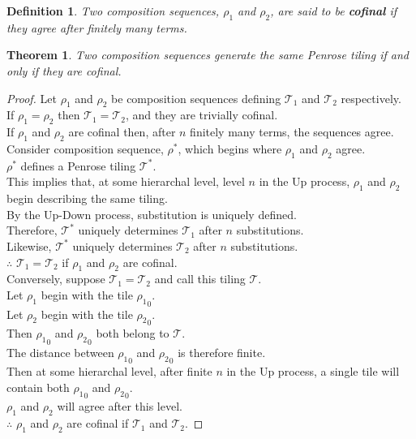 \documentclass[
  oneside,
  11pt, a4paper,
  footinclude=true,
  headinclude=true,
  cleardoublepage=empty
]{scrbook}
\newtheorem{mydef}{Definition}
\newtheorem{mythm}{Theorem}
\begin{document}
\begin{mydef}
Two composition sequences, $\rho_1$ and $\rho_2$, are said to be \textbf{cofinal} if they agree after finitely many terms.
\end{mydef}

\begin{mythm}
Two composition sequences generate the same Penrose tiling if and only if they are cofinal.
\end{mythm}

\begin{proof}
Let $\rho_1$ and $\rho_2$ be composition sequences defining $\mathcal{T}_1$ and $\mathcal{T}_2$ respectively. \\[10pt]
If $\rho_1 = \rho_2$ then $\mathcal{T}_1 = \mathcal{T}_2$, and they are trivially cofinal.\\[10pt]
If $\rho_1$ and $\rho_2$ are cofinal then, after $n$ finitely many terms, the sequences agree.\\
Consider composition sequence, $\rho^*$, which begins where $\rho_1$ and $\rho_2$ agree.\\
$\rho^*$ defines a Penrose tiling  $\mathcal{T}^*$.\\
This implies that, at some hierarchal level, level $n$ in the Up process, $\rho_1$ and $\rho_2$ begin describing the same tiling.\\
By the Up-Down process, substitution is uniquely defined.\\
Therefore, $\mathcal{T}^*$ uniquely determines $\mathcal{T}_1$ after $n$ substitutions.\\
Likewise, $\mathcal{T}^*$ uniquely determines $\mathcal{T}_2$ after $n$ substitutions.\\
$\therefore$ $\mathcal{T}_1 = \mathcal{T}_2$ if  $\rho_1$ and $\rho_2$ are cofinal.\\[10pt]
Conversely, suppose $\mathcal{T}_1 = \mathcal{T}_2$ and call this tiling $\mathcal{T}$. \\
Let $\rho_1$ begin with the tile  ${\rho_1}_0$.\\
Let $\rho_2$ begin with the tile ${\rho_2}_0$.\\
Then ${\rho_1}_0$ and ${\rho_2}_0$ both belong to $\mathcal{T}$.\\
The distance between ${\rho_1}_0$ and ${\rho_2}_0$ is therefore finite.\\
Then at some hierarchal level, after finite $n$ in the Up process, a single tile will contain both ${\rho_1}_0$ and ${\rho_2}_0$.\\
$\rho_1$ and $\rho_2$ will agree after this level.\\
$\therefore$ $\rho_1$ and $\rho_2$ are cofinal if $\mathcal{T}_1$ and $\mathcal{T}_2$.
\end{proof}
\end{document}
